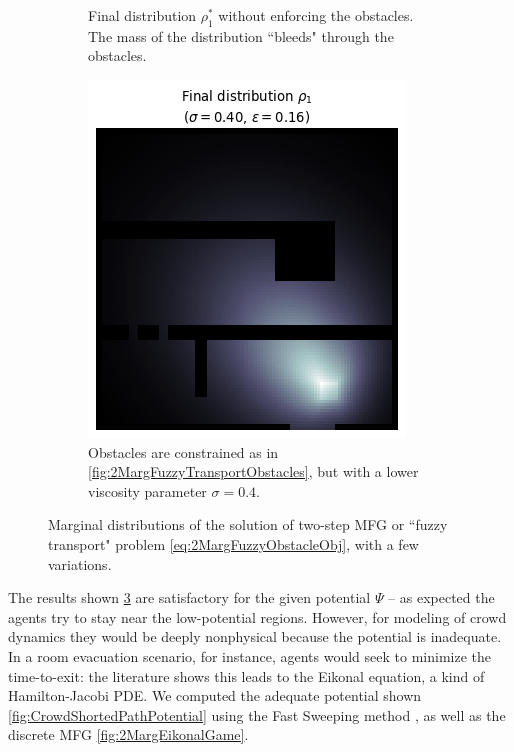 \documentclass[../report.tex]{subfiles}
\begin{document}
\begin{figure}
\begin{subfigure}[t]{.38\linewidth}
	\caption{Final distribution $\rho^*_1$ without enforcing the obstacles. The mass of the distribution ``bleeds" through the obstacles. }\label{fig:2MargFuzzyTransportRelaxedObst}
	\end{subfigure}
	\begin{subfigure}[t]{.38\linewidth}
	\centering
	\includegraphics[width=\linewidth]{../project/images/fuzzy_transport_lowvisc.png}
	\caption{Obstacles are constrained as in \cref{fig:2MargFuzzyTransportObstacles}, but with a lower viscosity parameter $\sigma=0.4$.}\label{fig:2MargFuzzyTransportLowVisc}
	\end{subfigure}
	\caption{Marginal distributions of the solution of two-step MFG or ``fuzzy transport" problem \eqref{eq:2MargFuzzyObstacleObj}, with a few variations.}\label{fig:2MargFuzzyTransportMarginals}
\end{figure}



\begin{remark}\label{rmk:SmartPotential} The results shown \cref{fig:2MargFuzzyTransportMarginals} are satisfactory for the given potential $\Psi$ -- as expected the agents try to stay near the low-potential regions. However, for modeling of crowd dynamics they would be deeply nonphysical because the potential is inadequate. In a room evacuation scenario, for instance, agents would seek to minimize the time-to-exit: the literature shows this leads to the Eikonal equation, a kind of Hamilton-Jacobi PDE. We computed the adequate potential shown \cref{fig:CrowdShortedPathPotential} using the Fast Sweeping method \parencite{Zhao2004AFS}, as well as the discrete MFG \cref{fig:2MargEikonalGame}.
\end{remark}
\end{document}
